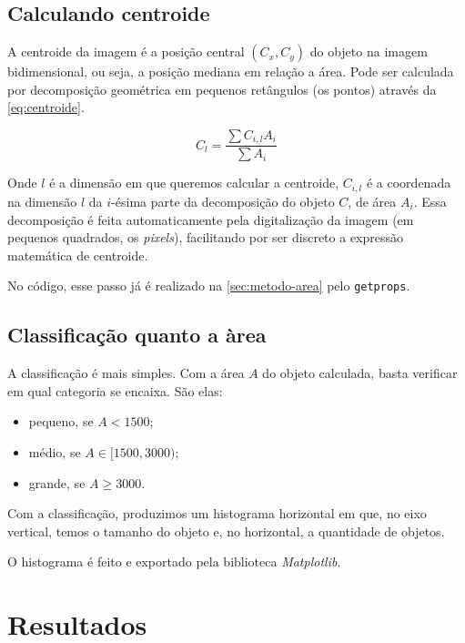 \documentclass[brazilian,a4paper,twocolumn]{article}
\begin{document}
    \subsection{Calculando centroide}

        A centroide da imagem é a posição central $ (C_x, C_y) $ do objeto na imagem bidimensional, ou seja, a posição mediana em relação a área. Pode ser calculada por decomposição geométrica em pequenos retângulos (os pontos) através da \cref{eq:centroide}.

        \begin{equation}
            \label{eq:centroide}
            C_l = \frac{\sum C_{i,l} A_i}{\sum A_i}
        \end{equation}

        Onde $l$ é a dimensão em que queremos calcular a centroide, $C_{i,l}$ é a coordenada na dimensão $l$ da $i$-ésima parte da decomposição do objeto $C$, de área $A_i$. Essa decomposição é feita automaticamente pela digitalização da imagem (em pequenos quadrados, os \textit{pixels}), facilitando por ser discreto a expressão matemática de centroide.

        No código, esse passo já é realizado na \cref{sec:metodo-area} pelo \texttt{getprops}.

    \subsection{Classificação quanto a àrea}

        A classificação é mais simples. Com a área $A$ do objeto calculada, basta verificar em qual categoria se encaixa. São elas:
        \begin{itemize}
            \item pequeno, se $A < 1500$;
            \item médio, se $A \in [1500, 3000)$;
            \item grande, se $A \geq 3000$.
        \end{itemize}

        Com a classificação, produzimos um histograma horizontal em que, no eixo vertical, temos o tamanho do objeto e, no horizontal, a quantidade de objetos.

        O histograma é feito e exportado pela biblioteca \emph{Matplotlib}.


\section{Resultados}
\end{document}
